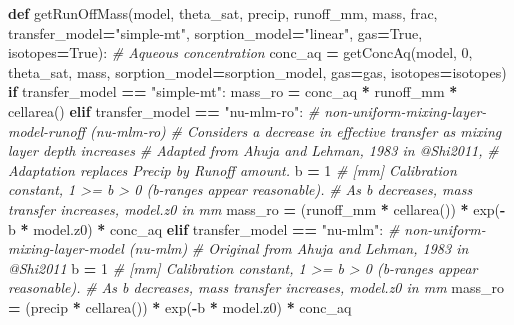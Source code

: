 \documentclass[]{article}
\newenvironment{Shaded}{\begin{snugshade}}{\end{snugshade}}
\newcommand{\KeywordTok}[1]{\textcolor[rgb]{0.13,0.29,0.53}{\textbf{#1}}}
\newcommand{\DecValTok}[1]{\textcolor[rgb]{0.00,0.00,0.81}{#1}}
\newcommand{\StringTok}[1]{\textcolor[rgb]{0.31,0.60,0.02}{#1}}
\newcommand{\CommentTok}[1]{\textcolor[rgb]{0.56,0.35,0.01}{\textit{#1}}}
\newcommand{\VariableTok}[1]{\textcolor[rgb]{0.00,0.00,0.00}{#1}}
\newcommand{\ControlFlowTok}[1]{\textcolor[rgb]{0.13,0.29,0.53}{\textbf{#1}}}
\newcommand{\OperatorTok}[1]{\textcolor[rgb]{0.81,0.36,0.00}{\textbf{#1}}}
\newcommand{\NormalTok}[1]{#1}
\begin{document}
\begin{Shaded}
\begin{Highlighting}[]
\KeywordTok{def}\NormalTok{ getRunOffMass(model, theta_sat, precip, runoff_mm,}
\NormalTok{                  mass, frac,}
\NormalTok{                  transfer_model}\OperatorTok{=}\StringTok{"simple-mt"}\NormalTok{, sorption_model}\OperatorTok{=}\StringTok{"linear"}\NormalTok{,}
\NormalTok{                  gas}\OperatorTok{=}\VariableTok{True}\NormalTok{, isotopes}\OperatorTok{=}\VariableTok{True}\NormalTok{):}
    \CommentTok{# Aqueous concentration}
\NormalTok{    conc_aq }\OperatorTok{=}\NormalTok{ getConcAq(model, }\DecValTok{0}\NormalTok{, theta_sat, mass,}
\NormalTok{                        sorption_model}\OperatorTok{=}\NormalTok{sorption_model, gas}\OperatorTok{=}\NormalTok{gas, isotopes}\OperatorTok{=}\NormalTok{isotopes)}
    \ControlFlowTok{if}\NormalTok{ transfer_model }\OperatorTok{==} \StringTok{"simple-mt"}\NormalTok{:}
\NormalTok{        mass_ro }\OperatorTok{=}\NormalTok{ conc_aq }\OperatorTok{*}\NormalTok{ runoff_mm }\OperatorTok{*}\NormalTok{ cellarea()}
    \ControlFlowTok{elif}\NormalTok{ transfer_model }\OperatorTok{==} \StringTok{"nu-mlm-ro"}\NormalTok{:}
        \CommentTok{# non-uniform-mixing-layer-model-runoff (nu-mlm-ro)}
        \CommentTok{# Considers a decrease in effective transfer as mixing layer depth increases}
        \CommentTok{# Adapted from Ahuja and Lehman, 1983 in @Shi2011,}
        \CommentTok{# Adaptation replaces Precip by Runoff amount.}
\NormalTok{        b }\OperatorTok{=} \DecValTok{1}  \CommentTok{# [mm] Calibration constant, 1 >= b > 0 (b-ranges appear reasonable).}
        \CommentTok{# As b decreases, mass transfer increases, model.z0 in mm}
\NormalTok{        mass_ro }\OperatorTok{=}\NormalTok{ (runoff_mm }\OperatorTok{*}\NormalTok{ cellarea()) }\OperatorTok{*}\NormalTok{ exp(}\OperatorTok{-}\NormalTok{b }\OperatorTok{*}\NormalTok{ model.z0) }\OperatorTok{*}\NormalTok{ conc_aq }
    \ControlFlowTok{elif}\NormalTok{ transfer_model }\OperatorTok{==} \StringTok{"nu-mlm"}\NormalTok{:}
        \CommentTok{# non-uniform-mixing-layer-model (nu-mlm)}
        \CommentTok{# Original from Ahuja and Lehman, 1983 in @Shi2011}
\NormalTok{        b }\OperatorTok{=} \DecValTok{1}  \CommentTok{# [mm] Calibration constant, 1 >= b > 0 (b-ranges appear reasonable).}
        \CommentTok{# As b decreases, mass transfer increases, model.z0 in mm}
\NormalTok{        mass_ro }\OperatorTok{=}\NormalTok{ (precip }\OperatorTok{*}\NormalTok{ cellarea()) }\OperatorTok{*}\NormalTok{ exp(}\OperatorTok{-}\NormalTok{b }\OperatorTok{*}\NormalTok{ model.z0) }\OperatorTok{*}\NormalTok{ conc_aq}

\end{Highlighting}
\end{Shaded}
\end{document}
